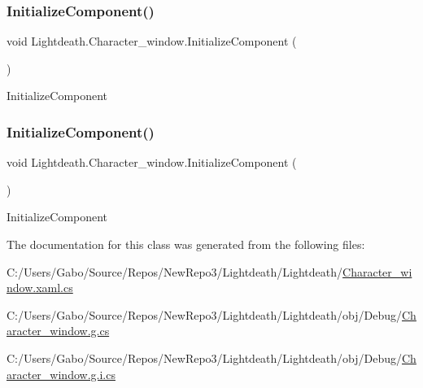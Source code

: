 \subsubsection{\texorpdfstring{Initialize\+Component()}{InitializeComponent()}\hspace{0.1cm}{\footnotesize\ttfamily [1/2]}}
{\footnotesize\ttfamily void Lightdeath.\+Character\+\_\+window.\+Initialize\+Component (\begin{DoxyParamCaption}{ }\end{DoxyParamCaption})\hspace{0.3cm}{\ttfamily [inline]}}



Initialize\+Component 

\hypertarget{class_lightdeath_1_1_character__window_ad8d9797968e3c28a54dbf1c57ac1d59d}{}\label{class_lightdeath_1_1_character__window_ad8d9797968e3c28a54dbf1c57ac1d59d} 
\subsubsection{\texorpdfstring{Initialize\+Component()}{InitializeComponent()}\hspace{0.1cm}{\footnotesize\ttfamily [2/2]}}
{\footnotesize\ttfamily void Lightdeath.\+Character\+\_\+window.\+Initialize\+Component (\begin{DoxyParamCaption}{ }\end{DoxyParamCaption})\hspace{0.3cm}{\ttfamily [inline]}}



Initialize\+Component 



The documentation for this class was generated from the following files\+:\begin{DoxyCompactItemize}
\item 
C\+:/\+Users/\+Gabo/\+Source/\+Repos/\+New\+Repo3/\+Lightdeath/\+Lightdeath/\hyperlink{_character__window_8xaml_8cs}{Character\+\_\+window.\+xaml.\+cs}\item 
C\+:/\+Users/\+Gabo/\+Source/\+Repos/\+New\+Repo3/\+Lightdeath/\+Lightdeath/obj/\+Debug/\hyperlink{_character__window_8g_8cs}{Character\+\_\+window.\+g.\+cs}\item 
C\+:/\+Users/\+Gabo/\+Source/\+Repos/\+New\+Repo3/\+Lightdeath/\+Lightdeath/obj/\+Debug/\hyperlink{_character__window_8g_8i_8cs}{Character\+\_\+window.\+g.\+i.\+cs}\end{DoxyCompactItemize}
